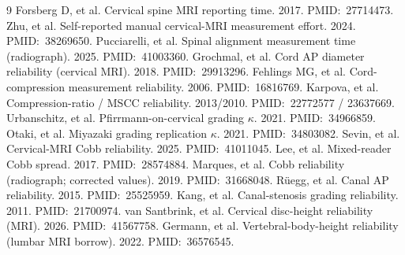\documentclass[11pt]{article}
\begin{document}
\begin{thebibliography}{9}
 Forsberg D, et al. Cervical spine MRI reporting time. 2017. PMID:~27714473.
 Zhu, et al. Self-reported manual cervical-MRI measurement effort. 2024. PMID:~38269650.
 Pucciarelli, et al. Spinal alignment measurement time (radiograph). 2025. PMID:~41003360.
 Grochmal, et al. Cord AP diameter reliability (cervical MRI). 2018. PMID:~29913296.
 Fehlings MG, et al. Cord-compression measurement reliability. 2006. PMID:~16816769.
 Karpova, et al. Compression-ratio / MSCC reliability. 2013/2010. PMID:~22772577 / 23637669.
 Urbanschitz, et al. Pfirrmann-on-cervical grading $\kappa$. 2021. PMID:~34966859.
 Otaki, et al. Miyazaki grading replication $\kappa$. 2021. PMID:~34803082.
 Sevin, et al. Cervical-MRI Cobb reliability. 2025. PMID:~41011045.
 Lee, et al. Mixed-reader Cobb spread. 2017. PMID:~28574884.
 Marques, et al. Cobb reliability (radiograph; corrected values). 2019. PMID:~31668048.
 R\"uegg, et al. Canal AP reliability. 2015. PMID:~25525959.
 Kang, et al. Canal-stenosis grading reliability. 2011. PMID:~21700974.
 van Santbrink, et al. Cervical disc-height reliability (MRI). 2026. PMID:~41567758.
 Germann, et al. Vertebral-body-height reliability (lumbar MRI borrow). 2022. PMID:~36576545.
\end{thebibliography}
\end{document}

